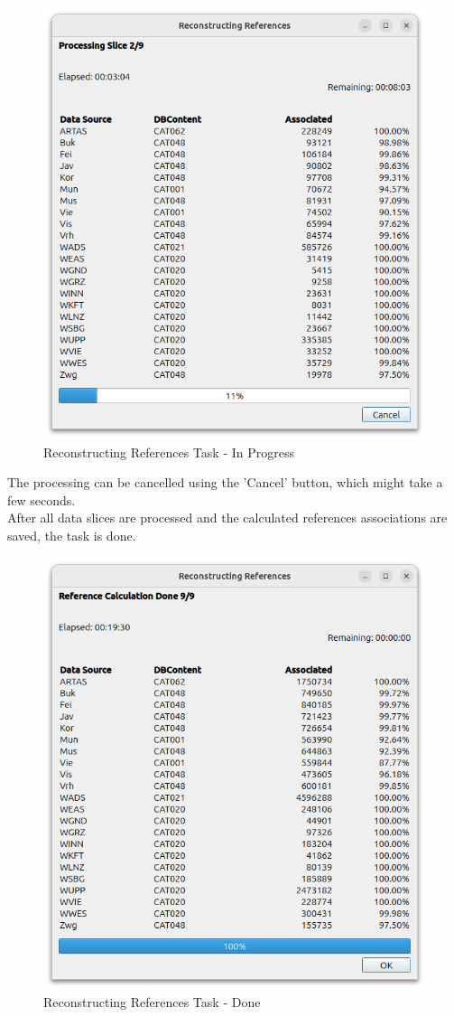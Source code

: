 \begin{itemize}
\begin{figure}[H]
    \center
      \includegraphics[width=12cm]{figures/process_in_progress.png}
    \caption{Reconstructing References Task - In Progress}
\end{figure}

The processing can be cancelled using the 'Cancel' button, which might take a few seconds. \\

After all data slices are processed and the calculated references associations are saved, the task is done.

\begin{figure}[H]
    \center
      \includegraphics[width=12cm]{figures/process_done.png}
    \caption{Reconstructing References Task - Done}
\end{figure}


\end{itemize}
